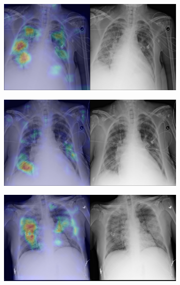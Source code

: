 \begin{figure}[b]
    \centering
    \begin{subfigure}{0.4\textwidth}
        \centering
        \includegraphics[width=1.0\textwidth]{Chapters/5. Conclusiones/img/Edema/1_1_00001373_031.png}
    \end{subfigure}
    \begin{subfigure}{0.4\textwidth}
        \centering
        \includegraphics[width=1.0\textwidth]{Chapters/5. Conclusiones/img/Edema/1_1_00001373_032.png}
    \end{subfigure}
    \begin{subfigure}{0.4\textwidth}
        \centering
        \includegraphics[width=1.0\textwidth]{Chapters/5. Conclusiones/img/Edema/1_1_00001787_000.png}

\end{subfigure}
\end{figure}
